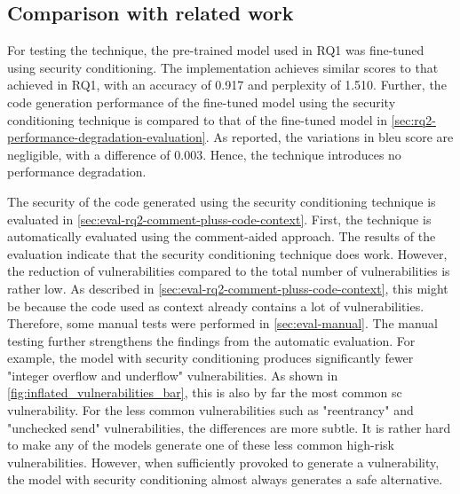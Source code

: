 \subsection{Comparison with related work}
\label{sec:rq2-comparison-with-related-work}
For testing the technique, the pre-trained model used in RQ1 was fine-tuned using security conditioning. The implementation achieves similar scores to that achieved in RQ1, with an accuracy of 0.917 and perplexity of 1.510. Further, the code generation performance of the fine-tuned model using the security conditioning technique is compared to that of the fine-tuned model in \cref{sec:rq2-performance-degradation-evaluation}. As reported, the variations in \acrshort{bleu} score are negligible, with a difference of 0.003. Hence, the technique introduces no performance degradation. 

The security of the code generated using the security conditioning technique is evaluated in \cref{sec:eval-rq2-comment-pluss-code-context}. First, the technique is automatically evaluated using the comment-aided approach. The results of the evaluation indicate that the security conditioning technique does work. However, the reduction of vulnerabilities compared to the total number of vulnerabilities is rather low. As described in \cref{sec:eval-rq2-comment-pluss-code-context}, this might be because the code used as context already contains a lot of vulnerabilities. Therefore, some manual tests were performed in \cref{sec:eval-manual}. The manual testing further strengthens the findings from the automatic evaluation. For example, the model with security conditioning produces significantly fewer "integer overflow and underflow" vulnerabilities. As shown in \cref{fig:inflated_vulnerabilities_bar}, this is also by far the most common \acrshort{sc} vulnerability. For the less common vulnerabilities such as "reentrancy" and "unchecked send" vulnerabilities, the differences are more subtle. It is rather hard to make any of the models generate one of these less common high-risk vulnerabilities. However, when sufficiently provoked to generate a vulnerability, the model with security conditioning almost always generates a safe alternative.


